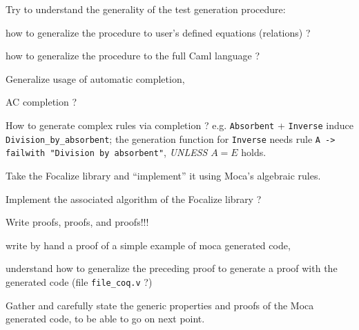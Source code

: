 
Try to understand the generality of the test generation procedure:
\begin{citemize}
\item how to generalize the procedure to user's defined equations (relations) ?
\item how to generalize the procedure to the full Caml language ?
\end{citemize}



\begin{citemize}
\item Generalize usage of automatic completion,
\item AC completion ?
\item How to generate complex rules via completion ?
      e.g. {\tt Absorbent} + {\tt Inverse} induce {\tt
      Division\_by\_absorbent};
      the generation function for {\tt Inverse} needs rule
      {\tt A -> failwith "Division by absorbent"},
      {\em UNLESS} $ A = E $ holds.
\end{citemize}


\begin{citemize}
 \item Take the Focalize library and ``implement'' it using Moca's algebraic
    rules.
 \item Implement the associated algorithm of the Focalize library ?
\end{citemize}


Write proofs, proofs, and proofs!!!

\begin{citemize}
 \item write by hand a proof of a simple example of moca generated code,
 \item understand how to generalize the preceding proof to generate a proof
 with the generated code (file {\tt file\_coq.v} ?)
\end{citemize}

Gather and carefully state the generic properties and proofs of the Moca
generated code, to be able to go on next point.



